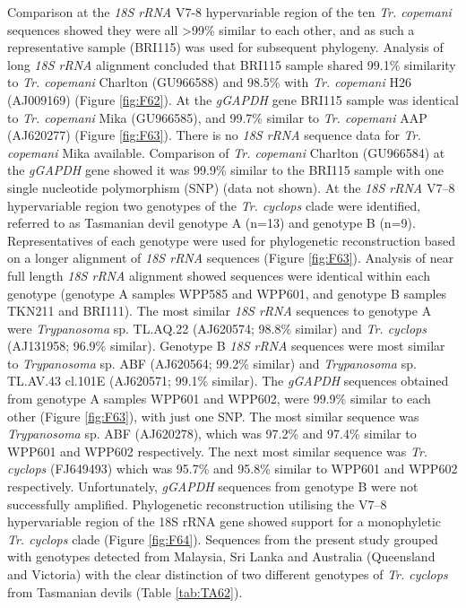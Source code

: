 \documentclass[a4paper, nobind]{templates/ociamthesis}
\begin{document}
Comparison at the \emph{18S rRNA} V7-8 hypervariable region of the ten \emph{Tr. copemani} sequences showed they were all \textgreater99\% similar to each other, and as such a representative sample (BRI115) was used for subsequent phylogeny.
Analysis of long \emph{18S rRNA} alignment concluded that BRI115 sample shared 99.1\% similarity to \emph{Tr. copemani} Charlton (GU966588) and 98.5\% with \emph{Tr. copemani} H26 (AJ009169) (Figure \ref{fig:F62}).
At the \emph{gGAPDH} gene BRI115 sample was identical to \emph{Tr. copemani} Mika (GU966585), and 99.7\% similar to \emph{Tr. copemani} AAP (AJ620277) (Figure \ref{fig:F63}).
There is no \emph{18S rRNA} sequence data for \emph{Tr. copemani} Mika available.
Comparison of \emph{Tr. copemani} Charlton (GU966584) at the \emph{gGAPDH} gene showed it was 99.9\% similar to the BRI115 sample with one single nucleotide polymorphism (SNP) (data not shown).
At the \emph{18S rRNA} V7--8 hypervariable region two genotypes of the \emph{Tr. cyclops} clade were identified, referred to as Tasmanian devil genotype A (n=13) and genotype B (n=9).
Representatives of each genotype were used for phylogenetic reconstruction based on a longer alignment of \emph{18S rRNA} sequences (Figure \ref{fig:F63}).
Analysis of near full length \emph{18S rRNA} alignment showed sequences were identical within each genotype (genotype A samples WPP585 and WPP601, and genotype B samples TKN211 and BRI111).
The most similar \emph{18S rRNA} sequences to genotype A were \emph{Trypanosoma} sp. TL.AQ.22 (AJ620574; 98.8\% similar) and \emph{Tr. cyclops} (AJ131958; 96.9\% similar).
Genotype B \emph{18S rRNA} sequences were most similar to \emph{Trypanosoma} sp. ABF (AJ620564; 99.2\% similar) and \emph{Trypanosoma} sp. TL.AV.43 cl.101E (AJ620571; 99.1\% similar).
The \emph{gGAPDH} sequences obtained from genotype A samples WPP601 and WPP602, were 99.9\% similar to each other (Figure \ref{fig:F63}), with just one SNP.
The most similar sequence was \emph{Trypanosoma} sp. ABF (AJ620278), which was 97.2\% and 97.4\% similar to WPP601 and WPP602 respectively.
The next most similar sequence was \emph{Tr. cyclops} (FJ649493) which was 95.7\% and 95.8\% similar to WPP601 and WPP602 respectively.
Unfortunately, \emph{gGAPDH} sequences from genotype B were not successfully amplified.
Phylogenetic reconstruction utilising the V7--8 hypervariable region of the 18S rRNA gene showed support for a monophyletic \emph{Tr. cyclops} clade (Figure \ref{fig:F64}).
Sequences from the present study grouped with genotypes detected from Malaysia, Sri Lanka and Australia (Queensland and Victoria) with the clear distinction of two different genotypes of \emph{Tr. cyclops} from Tasmanian devils (Table \ref{tab:TA62}).
\end{document}
